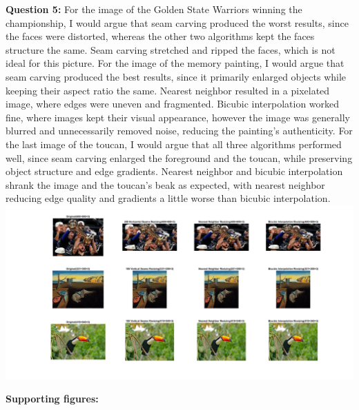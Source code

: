 \documentclass[11pt]{article}
\begin{document}
    \textbf{Question 5:}\newline
    For the image of the Golden State Warriors winning the championship, I would argue that seam carving produced the worst results, since the
    faces were distorted, whereas the other two algorithms kept the faces structure the same. Seam carving stretched and ripped the faces, which is
    not ideal for this picture. For the image of the memory painting, I would argue that seam carving produced the best results, since it primarily
    enlarged objects while keeping their aspect ratio the same. Nearest neighbor resulted in a pixelated image, where edges were uneven and
    fragmented. Bicubic interpolation worked fine, where images kept their visual appearance, however the image was generally blurred and
    unnecessarily removed noise, reducing the painting's authenticity. For the last image of the toucan, I would argue that all three algorithms
    performed well, since seam carving enlarged the foreground and the toucan, while preserving object structure and edge gradients. Nearest neighbor and bicubic
    interpolation shrank the image and the toucan's beak as expected, with nearest neighbor reducing edge quality and gradients a little worse than
    bicubic interpolation.\newline
    \includegraphics[width=\linewidth]{Part 2 Pictures/question5}\newline

    \textbf{Supporting figures:}\newline
\end{document}
